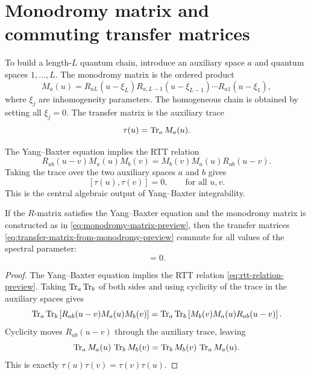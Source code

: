 \section{Monodromy matrix and commuting transfer matrices}
\label{sec:monodromy-transfer-preview}

To build a length-$L$ quantum chain, introduce an auxiliary space $a$ and quantum
spaces $1,\ldots,L$.  The monodromy matrix is the ordered product
\begin{equation}
\label{eq:monodromy-matrix-preview}
    M_a(u)
    =
    R_{aL}(u-\xi_L)R_{a,L-1}(u-\xi_{L-1})\cdots R_{a1}(u-\xi_1),
\end{equation}
where $\xi_j$ are inhomogeneity parameters.  The homogeneous chain is obtained by
setting all $\xi_j=0$.  The transfer matrix is the auxiliary trace
\begin{equation}
\label{eq:transfer-matrix-from-monodromy-preview}
    \tau(u)=\operatorname{Tr}_a M_a(u).
\end{equation}

The Yang--Baxter equation implies the RTT relation
\begin{equation}
\label{eq:rtt-relation-preview}
    R_{ab}(u-v)M_a(u)M_b(v)
    =
    M_b(v)M_a(u)R_{ab}(u-v) .
\end{equation}
Taking the trace over the two auxiliary spaces $a$ and $b$ gives
\begin{equation}
\label{eq:commuting-transfer-matrices-preview}
    [\tau(u),\tau(v)]=0,
    \qquad
    \text{for all }u,v .
\end{equation}
This is the central algebraic output of Yang--Baxter integrability.

\begin{theorem}
If the $R$-matrix satisfies the Yang--Baxter equation and the monodromy matrix is
constructed as in \cref{eq:monodromy-matrix-preview}, then the transfer matrices
\cref{eq:transfer-matrix-from-monodromy-preview} commute for all values of the
spectral parameter:
\begin{equation}
    [\tau(u),\tau(v)]=0 .
\end{equation}
\end{theorem}

\begin{proof}
The Yang--Baxter equation implies the RTT relation
\cref{eq:rtt-relation-preview}.  Taking $\operatorname{Tr}_a\operatorname{Tr}_b$ of both sides and using
cyclicity of the trace in the auxiliary spaces gives
\begin{equation}
    \operatorname{Tr}_a\operatorname{Tr}_b\left[R_{ab}(u-v)M_a(u)M_b(v)\right]
    =
    \operatorname{Tr}_a\operatorname{Tr}_b\left[M_b(v)M_a(u)R_{ab}(u-v)\right].
\end{equation}
Cyclicity moves $R_{ab}(u-v)$ through the auxiliary trace, leaving
\begin{equation}
    \operatorname{Tr}_a M_a(u)\,\operatorname{Tr}_b M_b(v)
    =
    \operatorname{Tr}_b M_b(v)\,\operatorname{Tr}_a M_a(u).
\end{equation}
This is exactly $\tau(u)\tau(v)=\tau(v)\tau(u)$.
\end{proof}

